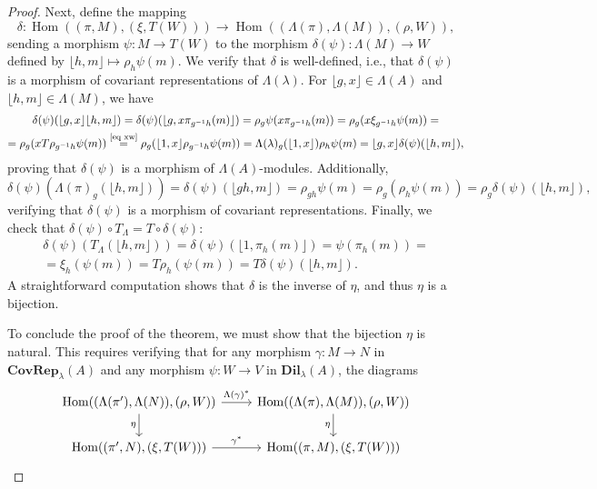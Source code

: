 \documentclass[11pt]{amsart}
\numberwithin{equation}{section}
\theoremstyle{definition}
\theoremstyle{remark}
\newcommand{\Hom}{\operatorname{Hom}}
\begin{document}
\begin{proof}
    Next, define the mapping
    \[
        \delta: \Hom((\pi, M), (\xi, T(W))) \to \Hom((\Lambda(\pi), \Lambda(M)), (\rho, W)),
    \]
    sending a morphism \(\psi: M \to T(W)\) to the morphism \(\delta(\psi): \Lambda(M) \to W\) defined by \(\lfloor h, m \rfloor \mapsto \rho_h\psi(m)\). We verify that \(\delta\) is well-defined, i.e., that \(\delta(\psi)\) is a morphism of covariant representations of \(\Lambda(\lambda)\). For \(\lfloor g, x \rfloor \in \Lambda(A)\) and \(\lfloor h, m \rfloor \in \Lambda(M)\), we have
    \begin{multline*}
        \delta(\psi)(\lfloor g,x\rfloor \lfloor h,m\rfloor)=\delta(\psi)(\lfloor g,x\pi_{g^{-1}h}(m)\rfloor)=\rho_g \psi(x\pi_{g^{-1}h}(m))=\rho_g(x\xi_{g^{-1}h}\psi(m))= \\ =\rho_g(xT\rho_{g^{-1}h}\psi(m)) \overset{\scriptsize\eqref{eq xw}}{=} \rho_g(\lfloor 1,x\rfloor\rho_{g^{-1}h}\psi(m))=\Lambda(\lambda)_g(\lfloor 1,x\rfloor) \rho_h\psi(m)=\lfloor g,x\rfloor \delta(\psi)(\lfloor h,m\rfloor),
    \end{multline*}
    proving that \(\delta(\psi)\) is a morphism of \(\Lambda(A)\)-modules. Additionally,
    \[
        \delta(\psi)(\Lambda(\pi)_g(\lfloor h, m \rfloor)) = \delta(\psi)(\lfloor gh, m \rfloor) = \rho_{gh}\psi(m) = \rho_g(\rho_h\psi(m)) = \rho_g\delta(\psi)(\lfloor h, m \rfloor),
    \]
    verifying that \(\delta(\psi)\) is a morphism of covariant representations. Finally, we check that \(\delta(\psi) \circ T_\Lambda = T \circ \delta(\psi)\):
\begin{multline*}
\delta(\psi)(T_\Lambda(\lfloor h, m \rfloor)) = \delta(\psi)(\lfloor 1, \pi_h(m) \rfloor) = \psi(\pi_h(m)) =\\= \xi_h(\psi(m)) = T\rho_h(\psi(m)) = T\delta(\psi)(\lfloor h, m \rfloor).
\end{multline*}    
A straightforward computation shows that \(\delta\) is the inverse of \(\eta\), and thus \(\eta\) is a bijection.

    To conclude the proof of the theorem, we must show that the bijection \(\eta\) is natural. This requires verifying that for any morphism \(\gamma: M \to N\) in  \(\textbf{CovRep}_{\lambda}(A)\)  and any morphism \(\psi: W \to V\) in  \(\textbf{Dil}_{\lambda}(A)\), the  diagrams 
    \[
        \begin{tikzcd}
            \Hom((\Lambda({\pi}'), \Lambda(N)), (\rho, W)) 
            \arrow[r, "\Lambda(\gamma)^*"] 
            \arrow[d, "\eta"'] 
            & \Hom((\Lambda(\pi), \Lambda(M)), (\rho, W))  
            \arrow[d, "\eta"']  \\
            \Hom(({\pi}', N), (\xi, T(W))) 
            \arrow[r, "\gamma^*"] 
            & \Hom((\pi, M), (\xi, T(W)))  
        \end{tikzcd}
    \]
    

\end{proof}
\end{document}
